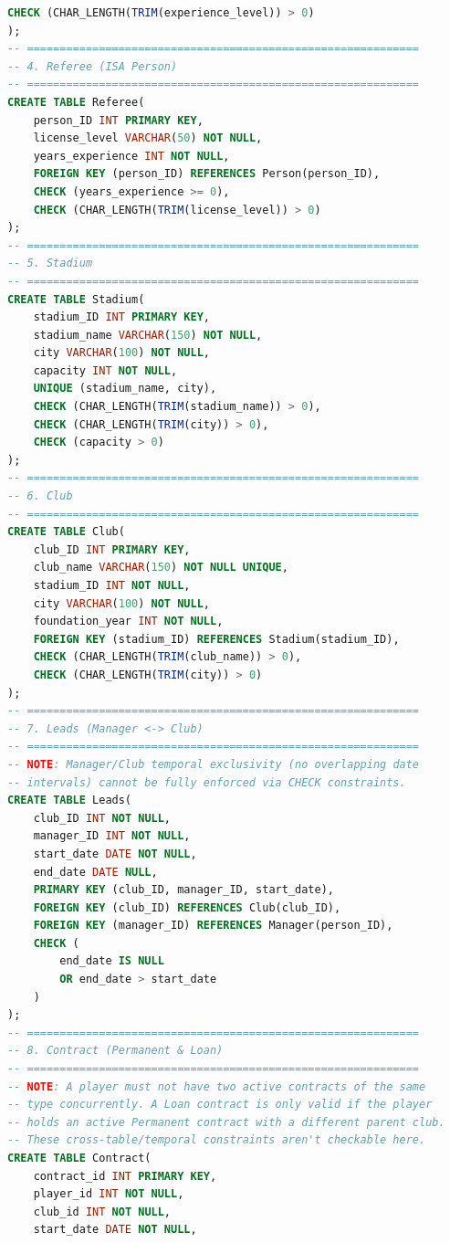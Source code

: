 \documentclass[12pt, a4paper]{article}
\begin{document}
\begin{lstlisting}[language=SQL, caption=Logical Schema DDL (part2.sql), label=lst:sql]
    CHECK (CHAR_LENGTH(TRIM(experience_level)) > 0)
);
-- ============================================================
-- 4. Referee (ISA Person)
-- ============================================================
CREATE TABLE Referee(
    person_ID INT PRIMARY KEY,
    license_level VARCHAR(50) NOT NULL,
    years_experience INT NOT NULL,
    FOREIGN KEY (person_ID) REFERENCES Person(person_ID),
    CHECK (years_experience >= 0),
    CHECK (CHAR_LENGTH(TRIM(license_level)) > 0)
);
-- ============================================================
-- 5. Stadium
-- ============================================================
CREATE TABLE Stadium(
    stadium_ID INT PRIMARY KEY,
    stadium_name VARCHAR(150) NOT NULL,
    city VARCHAR(100) NOT NULL,
    capacity INT NOT NULL,
    UNIQUE (stadium_name, city),
    CHECK (CHAR_LENGTH(TRIM(stadium_name)) > 0),
    CHECK (CHAR_LENGTH(TRIM(city)) > 0),
    CHECK (capacity > 0)
);
-- ============================================================
-- 6. Club
-- ============================================================
CREATE TABLE Club(
    club_ID INT PRIMARY KEY,
    club_name VARCHAR(150) NOT NULL UNIQUE,
    stadium_ID INT NOT NULL,
    city VARCHAR(100) NOT NULL,
    foundation_year INT NOT NULL,
    FOREIGN KEY (stadium_ID) REFERENCES Stadium(stadium_ID),
    CHECK (CHAR_LENGTH(TRIM(club_name)) > 0),
    CHECK (CHAR_LENGTH(TRIM(city)) > 0)
);
-- ============================================================
-- 7. Leads (Manager <-> Club)
-- ============================================================
-- NOTE: Manager/Club temporal exclusivity (no overlapping date
-- intervals) cannot be fully enforced via CHECK constraints.
CREATE TABLE Leads(
    club_ID INT NOT NULL,
    manager_ID INT NOT NULL,
    start_date DATE NOT NULL,
    end_date DATE NULL,
    PRIMARY KEY (club_ID, manager_ID, start_date),
    FOREIGN KEY (club_ID) REFERENCES Club(club_ID),
    FOREIGN KEY (manager_ID) REFERENCES Manager(person_ID),
    CHECK (
        end_date IS NULL
        OR end_date > start_date
    )
);
-- ============================================================
-- 8. Contract (Permanent & Loan)
-- ============================================================
-- NOTE: A player must not have two active contracts of the same 
-- type concurrently. A Loan contract is only valid if the player 
-- holds an active Permanent contract with a different parent club.
-- These cross-table/temporal constraints aren't checkable here.
CREATE TABLE Contract(
    contract_id INT PRIMARY KEY,
    player_id INT NOT NULL,
    club_id INT NOT NULL,
    start_date DATE NOT NULL,

\end{lstlisting}
\end{document}
